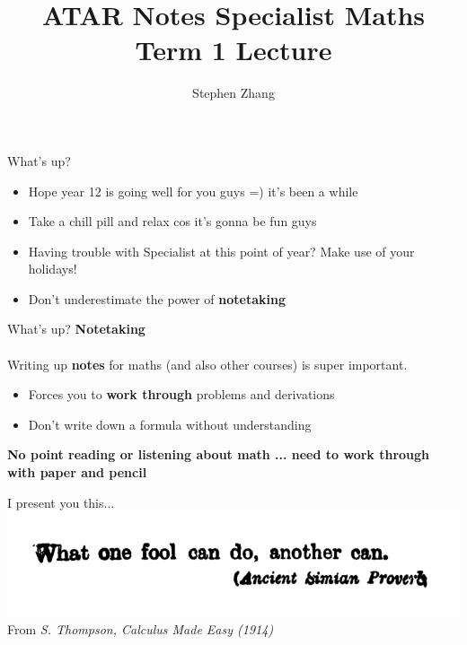 \documentclass{beamer}
\title{ATAR Notes Specialist Maths Term 1 Lecture}
\author{Stephen Zhang}
\begin{document}
\begin{frame}
	\titlepage
\end{frame}

\begin{frame}{What's up?}
	\begin{itemize}
		\item Hope year 12 is going well for you guys =) it's been a while
		\item Take a chill pill and relax cos it's gonna be fun guys
		\item Having trouble with Specialist at this point of year? Make use of your holidays!
		\item Don't underestimate the power of \textbf{notetaking}
	\end{itemize}
\end{frame}

\begin{frame}{What's up?}
	\textbf{Notetaking}\\~\\
	Writing up \textbf{notes} for maths (and also other courses) is super important.
	\begin{itemize}
		\item Forces you to \textbf{work through} problems and derivations
		\item Don't write down a formula without understanding
	\end{itemize}
	\begin{center}
		\textbf{No point reading or listening about math ... need to work through with paper and pencil}
	\end{center}
\end{frame}

\begin{frame}{I present you this...}
	\includegraphics[width = \linewidth]{img/quote1.png}\\
	From \textit{S. Thompson, Calculus Made Easy (1914)}
\end{frame}
\end{document}
